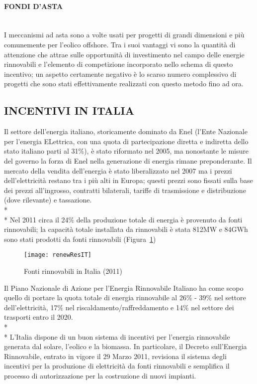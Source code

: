 \documentclass[12pt,a4paper,openright,twoside]{report}
\newcommand{\myparagraph}[1]{\paragraph{#1}\mbox{}\\}
\begin{document}
\myparagraph{FONDI D'ASTA}
I meccanismi ad asta sono a volte usati per progetti di grandi dimensioni e più comunemente per l'eolico offshore. Tra i suoi vantaggi vi sono la quantità di attenzione che attrae sulle opportunità di investimento nel campo delle energie rinnovabili e l'elemento di competizione incorporato nello schema di questo incentivo; un aspetto certamente negativo è lo scarso numero complessivo di progetti che sono stati effettivamente realizzati con questo metodo fino ad ora.


\subsection[INCENTIVI ITALIANI]{\nohyphens{INCENTIVI IN ITALIA}}
Il settore dell'energia italiano, storicamente dominato da Enel (l'Ente Nazionale per l'energia ELettrica, con una quota di partecipazione diretta e indiretta dello stato italiano parti al 31\%), è stato riformato nel 2005, ma nonostante le misure del governo la forza di Enel nella generazione di energia rimane preponderante. Il mercato della vendita dell'energia è stato liberalizzato nel 2007 ma i prezzi dell'elettricità restano tra i più alti in Europa; questi prezzi sono fissati sulla base dei prezzi all'ingrosso, contratti bilaterali, tariffe di trasmissione e distribuzione (dove rilevante) e tassazione.\\*\\*
Nel 2011 circa il 24\% della produzione totale di energia è provenuto da fonti rinnovabili; la capacità totale installata da rinnovabili è stata 812MW e 84GWh sono stati prodotti da fonti rinnovabili (Figura~\ref{renewResIT}) 

\begin{figure}[hbt]
	\centering
	\texttt{[image: renewResIT]}
	\caption{Fonti rinnovabili in Italia (2011)}
	\label{renewResIT}
\end{figure}

Il Piano Nazionale di Azione per l'Energia Rinnovabile Italiano ha come scopo quello di portare la quota totale di energia rinnovabile al 26\% - 39\% nel settore dell'elettricità, 17\% nel riscaldamento/raffreddamento e 14\% nel settore dei trasporti entro il 2020.\\*\\*  
L'Italia dispone di un buon sistema di incentivi per l'energia rinnovabile generata dal solare, l'eolico e la biomassa. In particolare, il Decreto sull'Energia Rinnovabile, entrato in vigore il 29 Marzo 2011, revisiona il sistema degli incentivi per la produzione di elettricità da fonti rinnovabili e semplifica il processo di autorizzazione per la costruzione di nuovi impianti.  
\end{document}
